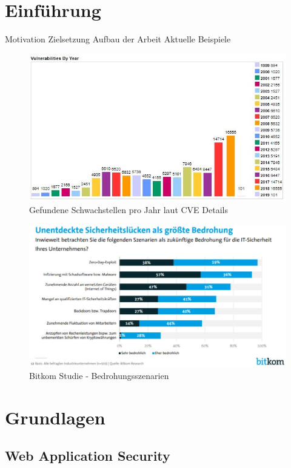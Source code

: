 \documentclass[12pt,oneside,a4paper,parskip]{scrbook}
\begin{document}
\mainmatter

\chapter{Einführung}\label{ch:intro}


Motivation
Zielsetzung
Aufbau der Arbeit
Aktuelle Beispiele
  \begin{figure}[!htb]
    \includegraphics[width=1\textwidth]{Images/VulnByYear}
    \caption[Gefundene Schwachstellen pro Jahr laut CVE Details]{Gefundene Schwachstellen pro Jahr laut CVE Details \cite{cve}}
  \end{figure}
  \begin{figure}[!htb]
    \includegraphics[width=1\textwidth]{Images/Bitkom}
    \caption[Bitkom Studie - Bedrohungsszenarien]{Bitkom Studie - Bedrohungsszenarien \cite{Bitkom}}
  \end{figure}

\chapter{Grundlagen}
  \section{Web Application Security}
\end{document}

